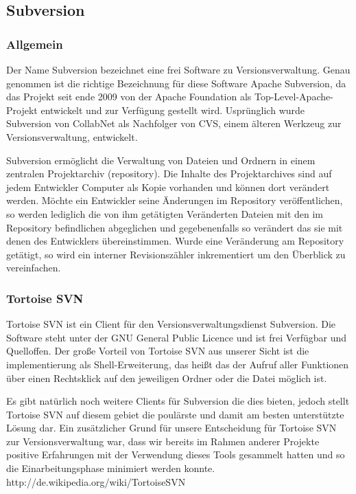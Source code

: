 \subsection{Subversion}
\subsubsection{Allgemein}
Der Name Subversion bezeichnet eine frei Software zu Versionsverwaltung. Genau genommen ist die richtige Bezeichnung für diese Software Apache Subversion, da das Projekt seit ende 2009 von der Apache Foundation als Top-Level-Apache-Projekt entwickelt und zur Verfügung gestellt wird. Usprünglich wurde Subversion von CollabNet als Nachfolger von CVS, einem älteren Werkzeug zur Versionsverwaltung, entwickelt.

Subversion ermöglicht die Verwaltung von Dateien und Ordnern in einem zentralen Projektarchiv (repository). Die Inhalte des Projektarchives sind auf jedem Entwickler Computer als Kopie vorhanden und können dort verändert werden. 
Möchte ein Entwickler seine Änderungen im Repository veröffentlichen, so werden lediglich die von ihm getätigten Veränderten Dateien mit den im Repository befindlichen abgeglichen und gegebenenfalls so verändert das sie mit denen des Entwicklers übereinstimmen. Wurde eine Veränderung am Repository getätigt, so wird ein interner Revisionszähler inkrementiert um den Überblick zu vereinfachen.

\subsubsection{Tortoise SVN}
Tortoise SVN ist ein Client für den Versionsverwaltungsdienst Subversion. Die Software steht unter der GNU General Public Licence und ist frei Verfügbar und Quelloffen. Der große Vorteil von Tortoise SVN aus unserer Sicht ist die implementierung als Shell-Erweiterung, das heißt das der Aufruf aller Funktionen über einen Rechtsklick auf den jeweiligen Ordner oder die Datei möglich ist.

Es gibt natürlich noch weitere Clients für Subversion die dies bieten, jedoch stellt Tortoise SVN auf diesem gebiet die poulärste und damit am besten unterstützte Lösung dar. Ein zusätzlicher Grund für unsere Entscheidung für Tortoise SVN zur Versionsverwaltung war, dass wir bereits im Rahmen anderer Projekte positive Erfahrungen mit der Verwendung dieses Tools gesammelt hatten und so die Einarbeitungsphase minimiert werden konnte. 
http://de.wikipedia.org/wiki/TortoiseSVN
